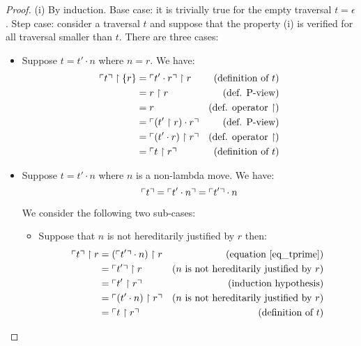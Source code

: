 \begin{proof}
(i) By induction. Base case: it is trivially true for the empty
traversal $t = \epsilon$. Step case: consider a traversal $t$ and
suppose that the property (i) is verified for all traversal smaller
than $t$. There are three cases:
\begin{itemize}
\item Suppose $t = t' \cdot n$ where $n = r$. We have:
    \begin{align*}
    \ulcorner t \urcorner \upharpoonright \{ r \}
        &=  \ulcorner t' \cdot r  \urcorner \upharpoonright  r       & (\mbox{definition of } t)\\
        &=  r \upharpoonright  r                         & (\mbox{def. P-view})\\
        &=  r                                                & (\mbox{def. operator $\upharpoonright$})\\
        &=  \ulcorner (t' \upharpoonright  r ) \cdot r  \urcorner    & (\mbox{def. P-view})\\
        &=  \ulcorner (t' \cdot r)  \upharpoonright  r  \urcorner    & (\mbox{def. operator $\upharpoonright$})\\
        &= \ulcorner t \upharpoonright  r  \urcorner                & (\mbox{definition of } t)
    \end{align*}

\item Suppose $t = t' \cdot n$ where $n$ is a non-lambda
move. We have:
    \begin{equation}
    \ulcorner t \urcorner = \ulcorner t' \cdot n \urcorner = \ulcorner t' \urcorner \cdot n  \label{eq_tprime}
    \end{equation}

    We consider the following two sub-cases:
    \begin{itemize}
    \item Suppose that $n$ is not hereditarily justified by $r$ then:
    \begin{align*}
    \ulcorner t \urcorner \upharpoonright  r
        &= (\ulcorner t' \urcorner \cdot n) \upharpoonright  r  & (\mbox{equation \ref{eq_tprime}}) \\
        &= \ulcorner t' \urcorner \upharpoonright  r            & (n \mbox{ is not hereditarily justified by } r) \\
        &= \ulcorner t' \upharpoonright  r  \urcorner           & (\mbox{induction hypothesis}) \\
        &= \ulcorner (t' \cdot n) \upharpoonright  r  \urcorner & (n \mbox{ is not hereditarily justified by } r) \\
        &= \ulcorner t \upharpoonright  r   \urcorner           & (\mbox{definition of } t)
    \end{align*}


\end{itemize}
\end{itemize}
\end{proof}
